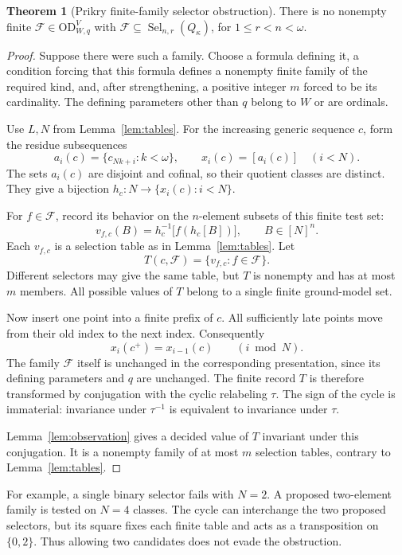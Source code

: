 \documentclass[11pt,letterpaper]{article}
\theoremstyle{definition}
\newtheorem{theorem}[definition]{Theorem}
\numberwithin{equation}{section}
\newcommand{\OD}{\mathrm{OD}}
\newcommand{\FF}{\mathcal F}
\newcommand{\Sel}{\operatorname{Sel}}
\newcommand{\ODW}{\OD^{V}_{W,q}}
\begin{document}
\begin{theorem}[Prikry finite-family selector obstruction]\label{thm:selectors}
There is no nonempty finite $\FF\in\ODW$ with $\FF\subseteq\Sel_{n,r}(Q_\kappa)$, for $1\leq r<n<\omega$.
\end{theorem}
\begin{proof}
Suppose there were such a family. Choose a formula defining it, a condition forcing that this formula defines a nonempty finite family of the required kind, and, after strengthening, a positive integer $m$ forced to be its cardinality. The defining parameters other than $q$ belong to $W$ or are ordinals.

Use $L,N$ from Lemma~\ref{lem:tables}. For the increasing generic sequence $c$, form the residue subsequences
\[
a_i(c)=\{c_{Nk+i}:k<\omega\},\qquad x_i(c)=[a_i(c)]\quad(i<N).
\]
The sets $a_i(c)$ are disjoint and cofinal, so their quotient classes are distinct. They give a bijection $h_c:N\longrightarrow\{x_i(c):i<N\}$.

For $f\in\FF$, record its behavior on the $n$-element subsets of this finite test set:
\[
v_{f,c}(B)=h_c^{-1}\bigl[f(h_c[B])\bigr],\qquad B\in[N]^n.
\]
Each $v_{f,c}$ is a selection table as in Lemma~\ref{lem:tables}. Let
\[
T(c,\FF)=\{v_{f,c}:f\in\FF\}.
\]
Different selectors may give the same table, but $T$ is nonempty and has at most $m$ members. All possible values of $T$ belong to a single finite ground-model set.

Now insert one point into a finite prefix of $c$. All sufficiently late points move from their old index to the next index. Consequently
\[
x_i(c^+)=x_{i-1}(c)\qquad(i\bmod N).
\]
The family $\FF$ itself is unchanged in the corresponding presentation, since its defining parameters and $q$ are unchanged. The finite record $T$ is therefore transformed by conjugation with the cyclic relabeling $\tau$. The sign of the cycle is immaterial: invariance under $\tau^{-1}$ is equivalent to invariance under $\tau$.

Lemma~\ref{lem:observation} gives a decided value of $T$ invariant under this conjugation. It is a nonempty family of at most $m$ selection tables, contrary to Lemma~\ref{lem:tables}.
\end{proof}

For example, a single binary selector fails with $N=2$. A proposed two-element family is tested on $N=4$ classes. The cycle can interchange the two proposed selectors, but its square fixes each finite table and acts as a transposition on $\{0,2\}$. Thus allowing two candidates does not evade the obstruction.
\end{document}
